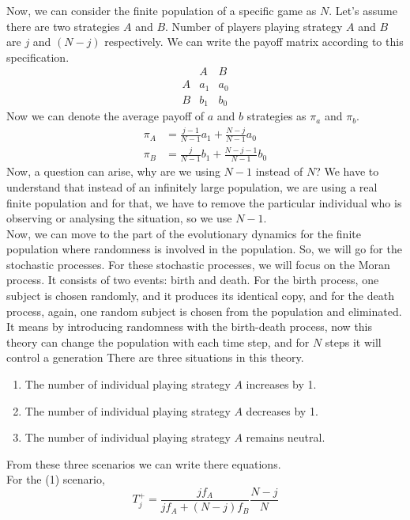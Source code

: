 \documentclass{article}
\begin{document}
Now, we can consider the finite population of a specific game as $N$.
Let's assume there are two strategies $A$ and $B$. Number of players playing strategy $A$ and $B$ are $j$ and $(N-j)$ respectively.
We can write the payoff matrix according to this specification.
\[
\begin{array}{c|cc}
    & A & B \\
    \hline
  A & a_1 & a_0 \\
  B & b_1 & b_0
\end{array}
\]
Now we can denote the average payoff of $a$ and $b$ strategies as $\pi_a$ and $\pi_b$.
\begin{align}
\pi_A&=\frac{j-1}{N-1}a_1 + \frac{N-j}{N-1}a_0 \nonumber\\
\pi_B&=\frac {j}{N-1}b_1 + \frac{N-j-1}{N-1}b_0\label{eq:12}
\end{align}
Now, a question can arise, why are we using $N-1$ instead of $N$? We have to understand that instead of an infinitely large population, we are using a real finite population and for that, we have to remove the particular individual who is observing or analysing the situation, so we use $N-1$.\\
Now, we can move to the part of the evolutionary dynamics for the finite population where randomness is involved in the population.
So, we will go for the stochastic processes.
For these stochastic processes, we will focus on the Moran process. It consists of two events: birth and death. 
For the birth process, one subject is chosen randomly, and it produces its identical copy, and for the death process, again, one random subject is chosen from the population and eliminated. 
It means by introducing randomness with the birth-death process, now this theory can change the population with each time step, and for $N$ steps it will control a generation \cite{Moran1962}
There are three situations in this theory.
\begin{enumerate}
\item The number of individual playing strategy $A$ increases by 1.
\item The number of individual playing strategy $A$ decreases by 1.
\item The number of individual playing strategy $A$ remains neutral.
\end{enumerate}
From these three scenarios we can write there equations.\\
For the (1) scenario,
\begin{equation}
T_j^+=\frac{jf_A}{jf_A+(N-j)f_B}\frac{N-j}{N} \label{eq:13}
\end{equation}
\end{document}
